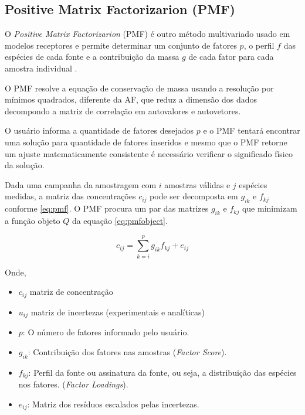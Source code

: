 
\subsection{Positive Matrix Factorizarion (\textbf{PMF})}

O \textit{Positive Matrix Factorizarion} (PMF) é outro método multivariado usado
em modelos receptores e permite determinar um conjunto de fatores $p$, 
o perfil $f$ das espécies de cada fonte e a contribuição da massa $g$ de cada fator 
para cada amostra individual \citep{norris2014}. 

O PMF resolve a equação de conservação de massa usando a resolução por 
mínimos quadrados, diferente da AF, que reduz a dimensão dos 
dados decompondo a matriz de correlação em autovalores e autovetores. 

O usuário informa a quantidade de fatores desejados $p$ e o PMF 
tentará encontrar uma solução para quantidade de fatores inseridos e 
mesmo que o PMF retorne um ajuste matematicamente consistente 
é necessário verificar o significado físico da solução.

Dada uma campanha da amostragem com $i$ amostras válidas e 
$j$ espécies medidas, a matriz das concentrações $c_{ij}$ 
pode ser decomposta em $g_{ik}$ e $f_{kj}$ conforme \ref{eq:pmf}. 
O PMF procura um par das matrizes $g_{ik}$ e $f_{kj}$ que
minimizam a função objeto $Q$ da equação \ref{eq:pmfobject}. 

\begin{equation}
  c_{ij} = \sum_{k=i}^p g_{ik}f_{kj} + e_{ij}
  \label{eq:pmf}
\end{equation}

Onde,
\begin{itemize}
  \item $c_{ij}$ matriz de concentração
  \item $u_{ij}$ matriz de incertezas (experimentais e analíticas)
  \item $p$: O número de fatores informado pelo usuário.
  \item $g_{ik}$: Contribuição dos fatores nas amostras (\textit{Factor Score}).
  \item $f_{kj}$: Perfil da fonte ou assinatura da fonte, ou seja, 
        a distribuição das espécies nos fatores. (\textit{Factor Loadings}).
  \item $e_{ij}$: Matriz dos resíduos escalados pelas incertezas.
\end{itemize}

